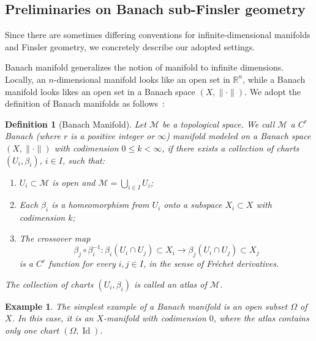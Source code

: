 \documentclass[12pt]{amsart}
\numberwithin{equation}{section}
\newtheorem{definition}{Definition}[section]
\newtheorem{example}{Example}[section]
\theoremstyle{remark}
\newcommand{\ql}[1]{\texttt{\color{cyan} QL: \footnotesize #1}}
\begin{document}
\subsection{Preliminaries on Banach sub-Finsler geometry}
\label{sec:banach_finsler_geometry}
Since there are sometimes differing conventions for infinite-dimensional manifolds
and Finsler geometry, we concretely describe our adopted settings.

Banach manifold generalizes the notion of manifold to infinite dimensions.
Locally, an $n$-dimensional manifold looks like an open set in $\mathbb R^n$,
while a Banach manifold looks likes an open set in a Banach space $(X, \|\cdot\|)$.
We adopt the definition of Banach manifolds as follows~\cite{deimling2013nonlinear}:
\begin{definition}[Banach Manifold]
    \label{def:banach_manifold}
Let $\mathcal M$ be a topological space.
We call $\mathcal M$ a $C^r$ Banach (where $r$ is a positive integer or $\infty$)
manifold modeled on a Banach space $(X, \|\cdot\|)$ with codimension $0\le k<\infty$,
if there exists a collection of \emph{charts} $(U_i, \beta_i)$, $i \in I$, such that:

\begin{enumerate}
    \item $U_i\subset \mathcal M$ is open and $\mathcal M=\bigcup_{i \in I} U_i$;

    \item Each $\beta_i$ is a homeomorphism from $U_i$ onto a subspace $X_i\subset X$ with codimension $k$;

    \item The crossover map
    \begin{equation}
        \beta_j \circ \beta_i^{-1}  : \beta_i(U_i \cap U_j) \subset X_i \to \beta_j(U_i \cap U_j)\subset X_j
    \end{equation}
    is a $C^r$ function for every $i,j \in I$, in the sense of Fr\'echet derivatives.
\end{enumerate}
The collection of charts $(U_i, \beta_i)$ is called an \emph{atlas} of $\mathcal M$.
\end{definition}
\begin{example}
The simplest example of a Banach manifold is an open subset $\Omega$ of $X$. In this case, it is an $X$-manifold with codimension $0$, where the atlas contains only one chart $(\Omega, \operatorname{Id})$.
\end{example}
\end{document}
